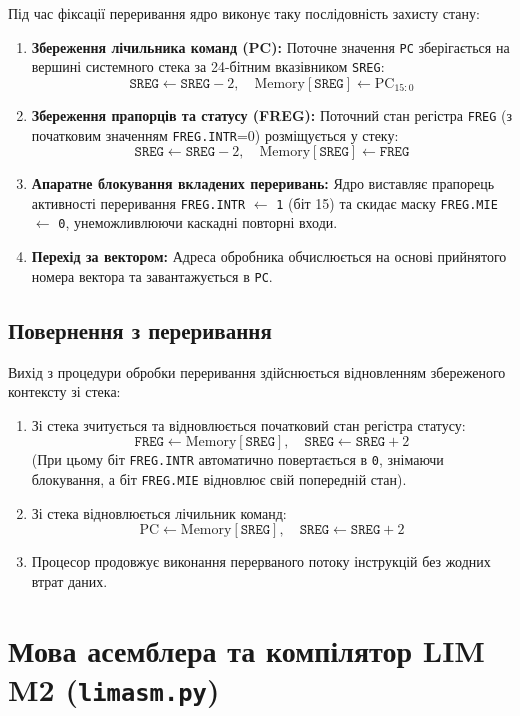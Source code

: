 \documentclass[11pt,a4paper]{article}
\newcommand{\reg}[1]{\texttt{#1}}
\begin{document}
Під час фіксації переривання ядро виконує таку послідовність захисту стану:
\begin{enumerate}
  \item \textbf{Збереження лічильника команд (PC):} Поточне значення \texttt{PC} зберігається на вершині системного стека за 24-бітним вказівником \reg{SREG}:
  $$\reg{SREG} \leftarrow \reg{SREG} - 2, \quad \text{Memory}[\reg{SREG}] \leftarrow \text{PC}_{15:0}$$
  \item \textbf{Збереження прапорців та статусу (FREG):} Поточний стан регістра \reg{FREG} (з початковим значенням \reg{FREG.INTR}=0) розміщується у стеку:
  $$\reg{SREG} \leftarrow \reg{SREG} - 2, \quad \text{Memory}[\reg{SREG}] \leftarrow \reg{FREG}$$
  \item \textbf{Апаратне блокування вкладених переривань:} Ядро виставляє прапорець активності переривання \reg{FREG.INTR} $\leftarrow$ \texttt{1} (біт 15) та скидає маску \reg{FREG.MIE} $\leftarrow$ \texttt{0}, унеможливлюючи каскадні повторні входи.
  \item \textbf{Перехід за вектором:} Адреса обробника обчислюється на основі прийнятого номера вектора та завантажується в \texttt{PC}.
\end{enumerate}

\subsection{Повернення з переривання}
Вихід з процедури обробки переривання здійснюється відновленням збереженого контексту зі стека:
\begin{enumerate}
  \item Зі стека зчитується та відновлюється початковий стан регістра статусу:
  $$\reg{FREG} \leftarrow \text{Memory}[\reg{SREG}], \quad \reg{SREG} \leftarrow \reg{SREG} + 2$$
  (При цьому біт \reg{FREG.INTR} автоматично повертається в \texttt{0}, знімаючи блокування, а біт \reg{FREG.MIE} відновлює свій попередній стан).
  \item Зі стека відновлюється лічильник команд:
  $$\text{PC} \leftarrow \text{Memory}[\reg{SREG}], \quad \reg{SREG} \leftarrow \reg{SREG} + 2$$
  \item Процесор продовжує виконання перерваного потоку інструкцій без жодних втрат даних.
\end{enumerate}

\clearpage
\section{Мова асемблера та компілятор LIM M2 (\texttt{limasm.py})}
\end{document}
